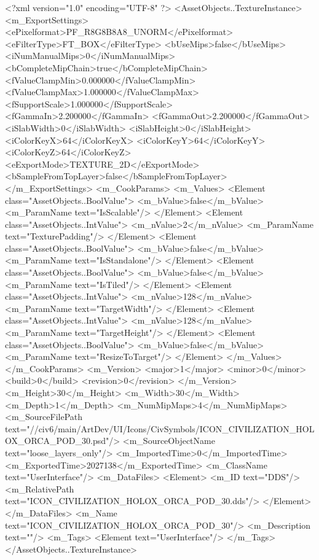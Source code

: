 <?xml version="1.0" encoding="UTF-8" ?>
<AssetObjects..TextureInstance>
	<m_ExportSettings>
		<ePixelformat>PF_R8G8B8A8_UNORM</ePixelformat>
		<eFilterType>FT_BOX</eFilterType>
		<bUseMips>false</bUseMips>
		<iNumManualMips>0</iNumManualMips>
		<bCompleteMipChain>true</bCompleteMipChain>
		<fValueClampMin>0.000000</fValueClampMin>
		<fValueClampMax>1.000000</fValueClampMax>
		<fSupportScale>1.000000</fSupportScale>
		<fGammaIn>2.200000</fGammaIn>
		<fGammaOut>2.200000</fGammaOut>
		<iSlabWidth>0</iSlabWidth>
		<iSlabHeight>0</iSlabHeight>
		<iColorKeyX>64</iColorKeyX>
		<iColorKeyY>64</iColorKeyY>
		<iColorKeyZ>64</iColorKeyZ>
		<eExportMode>TEXTURE_2D</eExportMode>
		<bSampleFromTopLayer>false</bSampleFromTopLayer>
	</m_ExportSettings>
	<m_CookParams>
		<m_Values>
			<Element class="AssetObjects..BoolValue">
				<m_bValue>false</m_bValue>
				<m_ParamName text="IsScalable"/>
			</Element>
			<Element class="AssetObjects..IntValue">
				<m_nValue>2</m_nValue>
				<m_ParamName text="TexturePadding"/>
			</Element>
			<Element class="AssetObjects..BoolValue">
				<m_bValue>false</m_bValue>
				<m_ParamName text="IsStandalone"/>
			</Element>
			<Element class="AssetObjects..BoolValue">
				<m_bValue>false</m_bValue>
				<m_ParamName text="IsTiled"/>
			</Element>
			<Element class="AssetObjects..IntValue">
				<m_nValue>128</m_nValue>
				<m_ParamName text="TargetWidth"/>
			</Element>
			<Element class="AssetObjects..IntValue">
				<m_nValue>128</m_nValue>
				<m_ParamName text="TargetHeight"/>
			</Element>
			<Element class="AssetObjects..BoolValue">
				<m_bValue>false</m_bValue>
				<m_ParamName text="ResizeToTarget"/>
			</Element>
		</m_Values>
	</m_CookParams>
	<m_Version>
		<major>1</major>
		<minor>0</minor>
		<build>0</build>
		<revision>0</revision>
	</m_Version>
	<m_Height>30</m_Height>
	<m_Width>30</m_Width>
	<m_Depth>1</m_Depth>
	<m_NumMipMaps>4</m_NumMipMaps>
	<m_SourceFilePath text="//civ6/main/ArtDev/UI/Icons/CivSymbols/ICON_CIVILIZATION_HOLOX_ORCA_POD_30.psd"/>
	<m_SourceObjectName text="loose_layers_only"/>
	<m_ImportedTime>0</m_ImportedTime>
	<m_ExportedTime>2027138</m_ExportedTime>
	<m_ClassName text="UserInterface"/>
	<m_DataFiles>
		<Element>
			<m_ID text="DDS"/>
			<m_RelativePath text="ICON_CIVILIZATION_HOLOX_ORCA_POD_30.dds"/>
		</Element>
	</m_DataFiles>
	<m_Name text="ICON_CIVILIZATION_HOLOX_ORCA_POD_30"/>
	<m_Description text=""/>
	<m_Tags>
		<Element text="UserInterface"/>
	</m_Tags>
</AssetObjects..TextureInstance>

